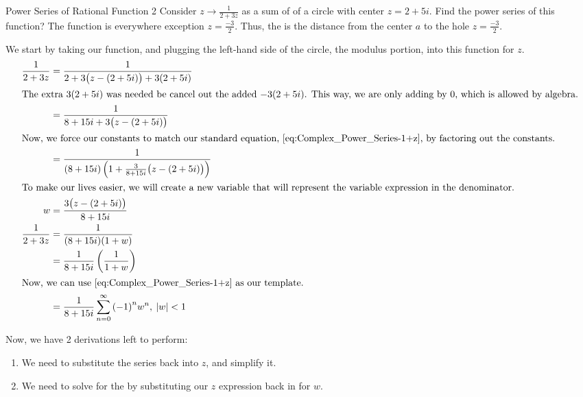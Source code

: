 \begin{example}{Power Series of Rational Function 2}
  Consider $z \to \frac{1}{2+3z}$ as a sum of  of a circle with center $z = 2 + 5i$.
  Find the power series of this function?
  \tcblower{}
  The function is  everywhere exception $z = \frac{-3}{2}$.
  Thus, the  is the distance from the center $a$ to the hole $z = \frac{-3}{2}$.

  We start by taking our function, and plugging the left-hand side of the circle, the modulus portion, into this function for $z$.
  \begin{align*}
    \frac{1}{2 + 3z} &= \frac{1}{2 + 3 \bigl( z - (2+5i) \bigr) + 3 (2+5i)} \\
    \intertext{The extra $3(2+5i)$ was needed be cancel out the added $-3(2+5i)$.
    This way, we are only adding by 0, which is allowed by algebra.}
                     &= \frac{1}{8 + 15i + 3 \bigl( z - (2+5i) \bigr)} \\
    \intertext{Now, we force our constants to match our standard equation, \Cref{eq:Complex_Power_Series-1+z}, by factoring out the constants.}
                     &= \frac{1}{(8 + 15i) \left( 1 + \frac{3}{8+15i} \bigl( z - (2+5i) \bigr) \right)} \\
    \intertext{To make our lives easier, we will create a new variable that will represent the variable expression in the denominator.}
    w &= \frac{3 \bigl( z - (2+5i) \bigr)}{8+15i} \\
    \frac{1}{2 + 3z} &= \frac{1}{(8+15i) (1+w)} \\
                     &= \frac{1}{8+15i} \left( \frac{1}{1+w} \right) \\
    \intertext{Now, we can use \Cref{eq:Complex_Power_Series-1+z} as our template.}
    &= \frac{1}{8+15i} \sum_{n=0}^{\infty} {(-1)}^{n} w^{n}, \: \Modulus{w} < 1
  \end{align*}

  Now, we have 2 derivations left to perform:
  \begin{enumerate}[noitemsep]
  \item We need to substitute the series back into $z$, and simplify it.
  \item We need to solve for the  by substituting our $z$ expression back in for $w$.
  \end{enumerate}


\end{example}
